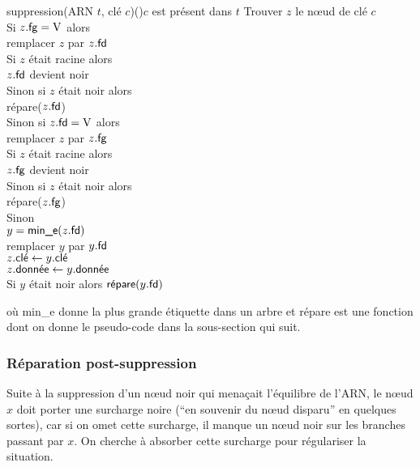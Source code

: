			\begin{pscode}{suppression}{(ARN \(t\), clé \(c\))}{()}{\(c\) est présent dans $t$}
				Trouver \(z\) le n\oe ud de clé \(c\) \\
				Si \(z.\text{\textsf{fg}} = \mathrm{V}\) alors \\ \Indp
					remplacer \(z\) par \(z.\text{\textsf{fd}}\) \\
					Si \(z\) était racine alors \\ \Indp
						\(z.\text{\textsf{fd}}\) devient noir \\ \Indm
					Sinon si \(z\) était noir alors \\ \Indp
						\textsf{répare}(\(z.\text{\textsf{fd}}\)) \\ \Indm \Indm
				Sinon si \(z.\text{\textsf{fd}} = \mathrm{V}\) alors \\ \Indp
					remplacer \(z\) par \(z.\text{\textsf{fg}}\) \\
					Si \(z\) était racine alors \\ \Indp
						\(z.\text{\textsf{fg}}\) devient noir \\ \Indm
					Sinon si \(z\) était noir alors \\ \Indp
					\textsf{répare}(\(z.\text{\textsf{fg}}\)) \\ \Indm \Indm
				Sinon  \\ \Indp
					\(y = \text{\textsf{min\_e}}(z.\text{\textsf{fd}})\)  \\
					remplacer \(y\) par \(y.\text{\textsf{fd}}\) \\
					\(z.\text{\textsf{clé}} \gets y.\text{\textsf{clé}}\) \\
					\(z.\text{\textsf{donnée}} \gets y.\text{\textsf{donnée}}\) \\
					Si \(y\) était noir alors \(\text{\textsf{répare}}(y.\text{\textsf{fd}})\)
			\end{pscode}
			
			où \textsf{min\_e} donne la plus grande étiquette dans un arbre et \textsf{répare} est une fonction dont on donne le pseudo-code dans la sous-section qui suit.
			
		\subsubsection{Réparation post-suppression}
			
			Suite à la suppression d'un n\oe ud noir qui menaçait l'équilibre de l'ARN, le n\oe ud \(x\) doit porter une surcharge noire (``en souvenir du n\oe ud disparu'' en quelques sortes), car si on omet cette surcharge, il manque un n\oe ud noir sur les branches passant par \(x\). On cherche à absorber cette surcharge pour régulariser la situation.
			
